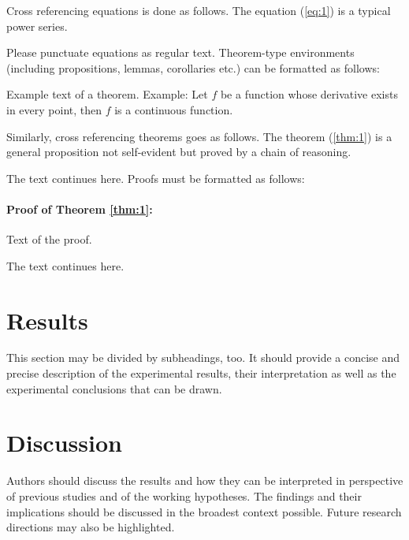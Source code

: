 \documentclass[JDR,PDF]{jdr}
\newenvironment{myproof}[2] {\paragraph{Proof of {#1} {#2}:}}{\hfill}
\begin{document}
Cross referencing equations is done as follows. The equation (\ref{eq:1}) is a typical power series.

Please punctuate equations as regular text. Theorem-type environments (including propositions, lemmas, corollaries etc.) can be formatted as follows:
\begin{theorem} \label{thm:1}
Example text of a theorem. Example: Let $f$ be a function whose derivative exists in every point, then $f$ is a continuous function.
\end{theorem}

Similarly, cross referencing theorems goes as follows. The theorem (\ref{thm:1}) is a general proposition not self-evident but proved by a chain of reasoning.

The text continues here. Proofs must be formatted as follows:

\begin{myproof}{Theorem}{\ref{thm:1}}
Text of the proof.
\end{myproof}

The text continues here.




\section{Results}

This section may be divided by subheadings, too. It should provide a concise and precise description of the experimental results, their interpretation as well as the experimental conclusions that can be drawn.


\section{Discussion}

Authors should discuss the results and how they can be interpreted in perspective of previous studies and of the working hypotheses. The findings and their implications should be discussed in the broadest context possible. Future research directions may also be highlighted.

\end{document}
